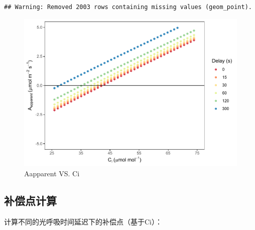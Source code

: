 \documentclass[
]{krantz}
\begin{document}
\begin{verbatim}
## Warning: Removed 2003 rows containing missing values (geom_point).
\end{verbatim}

\begin{figure}
\centering
\includegraphics{bookdown_files/figure-latex/aappci-1.pdf}
\caption{\label{fig:aappci}Aapparent VS. Ci}
\end{figure}

\hypertarget{multi6}{%
\subsection{补偿点计算}\label{multi6}}

计算不同的光呼吸时间延迟下的补偿点（基于Ci）：
\end{document}
